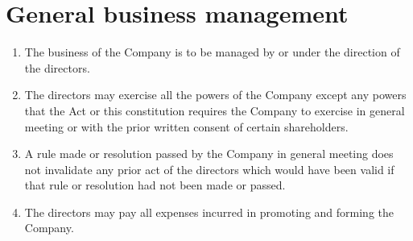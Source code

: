 \section{General business management}

\begin{enumerate}[label=(\alph*)]
    \item The business of the Company is to be managed by or under the direction of the directors.
    
    \item The directors may exercise all the powers of the Company except any powers that the Act or this constitution requires the Company to exercise in general meeting or with the prior written consent of certain shareholders.
    
    \item A rule made or resolution passed by the Company in general meeting does not invalidate any prior act of the directors which would have been valid if that rule or resolution had not been made or passed.
    
    \item The directors may pay all expenses incurred in promoting and forming the Company.
\end{enumerate} 